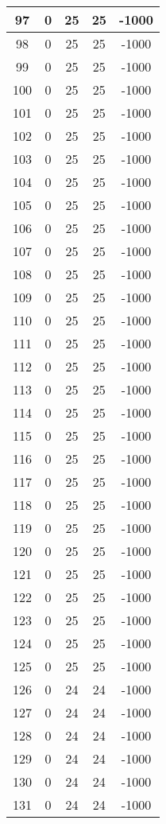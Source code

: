 \documentclass[letterpaper, 12pt]{article}
\begin{document}
\begin{longtable}{|c|c|c|c|c|}
\hline
97 & 0 & 25 & 25 & -1000 \\
\hline
98 & 0 & 25 & 25 & -1000 \\
\hline
99 & 0 & 25 & 25 & -1000 \\
\hline
100 & 0 & 25 & 25 & -1000 \\
\hline
101 & 0 & 25 & 25 & -1000 \\
\hline
102 & 0 & 25 & 25 & -1000 \\
\hline
103 & 0 & 25 & 25 & -1000 \\
\hline
104 & 0 & 25 & 25 & -1000 \\
\hline
105 & 0 & 25 & 25 & -1000 \\
\hline
106 & 0 & 25 & 25 & -1000 \\
\hline
107 & 0 & 25 & 25 & -1000 \\
\hline
108 & 0 & 25 & 25 & -1000 \\
\hline
109 & 0 & 25 & 25 & -1000 \\
\hline
110 & 0 & 25 & 25 & -1000 \\
\hline
111 & 0 & 25 & 25 & -1000 \\
\hline
112 & 0 & 25 & 25 & -1000 \\
\hline
113 & 0 & 25 & 25 & -1000 \\
\hline
114 & 0 & 25 & 25 & -1000 \\
\hline
115 & 0 & 25 & 25 & -1000 \\
\hline
116 & 0 & 25 & 25 & -1000 \\
\hline
117 & 0 & 25 & 25 & -1000 \\
\hline
118 & 0 & 25 & 25 & -1000 \\
\hline
119 & 0 & 25 & 25 & -1000 \\
\hline
120 & 0 & 25 & 25 & -1000 \\
\hline
121 & 0 & 25 & 25 & -1000 \\
\hline
122 & 0 & 25 & 25 & -1000 \\
\hline
123 & 0 & 25 & 25 & -1000 \\
\hline
124 & 0 & 25 & 25 & -1000 \\
\hline
125 & 0 & 25 & 25 & -1000 \\
\hline
126 & 0 & 24 & 24 & -1000 \\
\hline
127 & 0 & 24 & 24 & -1000 \\
\hline
128 & 0 & 24 & 24 & -1000 \\
\hline
129 & 0 & 24 & 24 & -1000 \\
\hline
130 & 0 & 24 & 24 & -1000 \\
\hline
131 & 0 & 24 & 24 & -1000 \\

\end{longtable}
\end{document}
